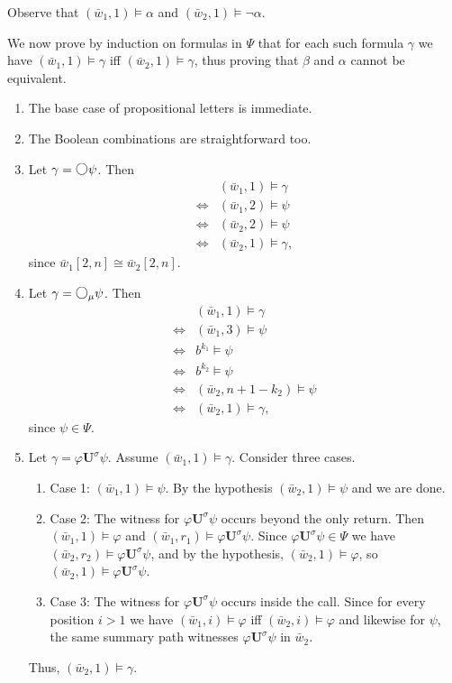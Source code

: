\documentclass{LMCS}
\newcommand{\M}{{\mu}}
\newcommand{\w}{{\bar{w}}}
\newcommand{\dm}{\Diamond}
\newcommand{\U}{{\mathbf U}}
\newcommand{\next}{\text{\raisebox{1pt}{$\bigcirc$}}}
\renewcommand{\phi}{\varphi}
\theoremstyle{plain}
\theoremstyle{definition}
\newcommand{\ppath}{\sigma} \newcommand{\Ul}{\U}
\newcommand{\Up}{\U^\ppath}
\newcommand{\dmm}{\dm_{\M}}
\renewcommand{\dm}{\next}
\renewcommand{\dmm}{\dm_\M}
\newcommand{\LRA}{\Leftrightarrow}
\begin{document}
Observe that $(\w_1,1)\models\alpha$ and $(\w_2,1)\models\neg\alpha$. 

We now prove by induction on formulas in $\Psi$ that for each such 
formula $\gamma$ we have $(\w_1,1)\models\gamma$ iff
$(\w_2,1)\models\gamma$, thus proving that $\beta$ and $\alpha$ cannot
be equivalent. 

\begin{enumerate}[$\bullet$]
\item The base case of propositional letters is immediate.
\item The Boolean combinations are straightforward too.
\item Let $\gamma=\dm\psi$. Then 
$$\begin{array}{cl}
& (\w_1,1) \models \gamma \\
\LRA & (\w_1,2)\models\psi\\
\LRA & (\w_2,2)\models\psi\\
\LRA & (\w_2,1)\models\gamma,
\end{array}
$$
since $\w_1[2,n]\cong \w_2[2,n]$.
\item Let $\gamma=\dmm\psi$. Then 
$$\begin{array}{cl}
& (\w_1,1) \models \gamma \\
\LRA & (\w_1,3)\models\psi\\
\LRA & b^{k_1} \models \psi\\
\LRA & b^{k_2} \models \psi\\
\LRA & (\w_2,n+1-k_2)\models\psi\\
\LRA & (\w_2,1)\models\gamma,
\end{array}
$$
since $\psi\in\Psi$.
\item Let $\gamma = \phi\Up\psi$. Assume
  $(\w_1,1)\models\gamma$. Consider three cases.
\begin{enumerate}[(1)]
\item[]Case 1: $(\w_1,1)\models\psi$. By the hypothesis
  $(\w_2,1)\models\psi$ and we are done. 

\item[]Case 2: The witness for $\phi\Up\psi$ occurs beyond the only
  return. Then $(\w_1,1)\models\phi$ and
  $(\w_1,r_1)\models\phi\Up\psi$. Since $\phi\Up\psi\in\Psi$ we have
  $(\w_2,r_2)\models \phi\Up\psi$, and by the hypothesis,
  $(\w_2,1)\models\phi$, so $(\w_2,1)\models\phi\Up\psi$.


\item[]Case 3: The witness for $\phi\Up\psi$ occurs inside the
  call. Since for every position $i> 1$ we have $(\w_1,i)\models\phi$
  iff $(\w_2,i)\models\phi$ and likewise for $\psi$, the same summary
  path witnesses $\phi\Up\psi$ in $\w_2$. 
\end{enumerate}
Thus, $(\w_2,1)\models\gamma$. 


\end{enumerate}
\end{document}
